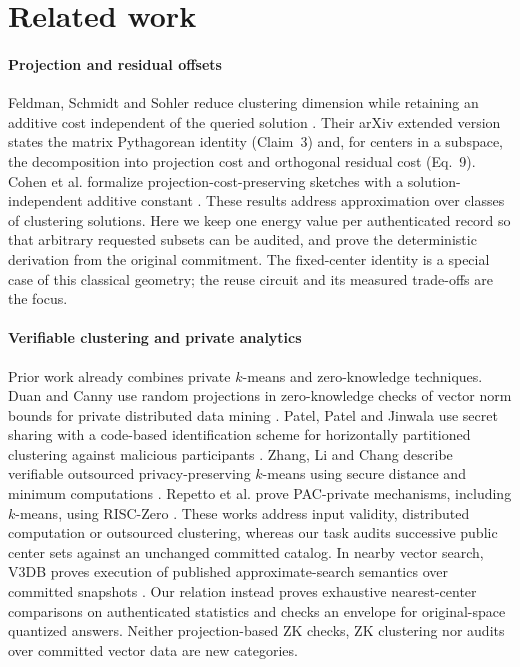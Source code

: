\section{Related work}\label{sec:related}
\paragraph{Projection and residual offsets}
Feldman, Schmidt and Sohler reduce clustering dimension while retaining an additive cost independent of the queried solution \cite{feldman2013tiny,feldman2020tiny}. Their arXiv extended version states the matrix Pythagorean identity (Claim~3) and, for centers in a subspace, the decomposition into projection cost and orthogonal residual cost (Eq.~9). Cohen et al. formalize projection-cost-preserving sketches with a solution-independent additive constant \cite{cohen2015dimensionality}. These results address approximation over classes of clustering solutions. Here we keep one energy value per authenticated record so that arbitrary requested subsets can be audited, and prove the deterministic derivation from the original commitment. The fixed-center identity is a special case of this classical geometry; the reuse circuit and its measured trade-offs are the focus.

\paragraph{Verifiable clustering and private analytics}
Prior work already combines private $k$-means and zero-knowledge techniques. Duan and Canny use random projections in zero-knowledge checks of vector norm bounds for private distributed data mining \cite{duan2008private}. Patel, Patel and Jinwala use secret sharing with a code-based identification scheme for horizontally partitioned clustering against malicious participants \cite{patel2013clustering}. Zhang, Li and Chang describe verifiable outsourced privacy-preserving $k$-means using secure distance and minimum computations \cite{zhang2021verifiable}. Repetto et al. prove PAC-private mechanisms, including $k$-means, using RISC-Zero \cite{repetto2026pac}. These works address input validity, distributed computation or outsourced clustering, whereas our task audits successive public center sets against an unchanged committed catalog. In nearby vector search, V3DB proves execution of published approximate-search semantics over committed snapshots \cite{v3db2026}. Our relation instead proves exhaustive nearest-center comparisons on authenticated statistics and checks an envelope for original-space quantized answers. Neither projection-based ZK checks, ZK clustering nor audits over committed vector data are new categories.

